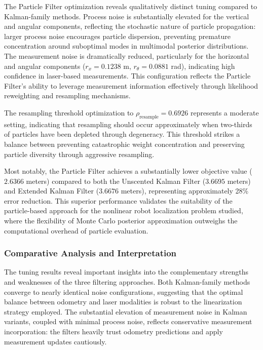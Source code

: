 \documentclass[conference]{IEEEtran}
\begin{document}
The Particle Filter optimization reveals qualitatively distinct tuning compared to Kalman-family methods. Process noise is substantially elevated for the vertical and angular components, reflecting the stochastic nature of particle propagation: larger process noise encourages particle dispersion, preventing premature concentration around suboptimal modes in multimodal posterior distributions. The measurement noise is dramatically reduced, particularly for the horizontal and angular components ($r_x = 0.1238$ m, $r_\theta = 0.0881$ rad), indicating high confidence in laser-based measurements. This configuration reflects the Particle Filter's ability to leverage measurement information effectively through likelihood reweighting and resampling mechanisms.

The resampling threshold optimization to $\rho_{\text{resample}} = 0.6926$ represents a moderate setting, indicating that resampling should occur approximately when two-thirds of particles have been depleted through degeneracy. This threshold strikes a balance between preventing catastrophic weight concentration and preserving particle diversity through aggressive resampling.

Most notably, the Particle Filter achieves a substantially lower objective value ($2.6366$ meters) compared to both the Unscented Kalman Filter ($3.6695$ meters) and Extended Kalman Filter ($3.6676$ meters), representing approximately 28\% error reduction. This superior performance validates the suitability of the particle-based approach for the nonlinear robot localization problem studied, where the flexibility of Monte Carlo posterior approximation outweighs the computational overhead of particle evaluation.

\subsubsection{Comparative Analysis and Interpretation}

The tuning results reveal important insights into the complementary strengths and weaknesses of the three filtering approaches. Both Kalman-family methods converge to nearly identical noise configurations, suggesting that the optimal balance between odometry and laser modalities is robust to the linearization strategy employed. The substantial elevation of measurement noise in Kalman variants, coupled with minimal process noise, reflects conservative measurement incorporation: the filters heavily trust odometry predictions and apply measurement updates cautiously.
\end{document}
